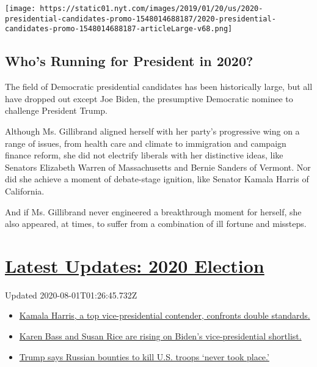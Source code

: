 \href{https://www.nytimes.com/interactive/2019/us/politics/2020-presidential-candidates.html}{}

\texttt{[image: https://static01.nyt.com/images/2019/01/20/us/2020-presidential-candidates-promo-1548014688187/2020-presidential-candidates-promo-1548014688187-articleLarge-v68.png]}

\hypertarget{whos-running-for-president-in-2020}{%
\subsection{Who's Running for President in
2020?}\label{whos-running-for-president-in-2020}}

The field of Democratic presidential candidates has been historically
large, but all have dropped out except Joe Biden, the presumptive
Democratic nominee to challenge President Trump.

Although Ms. Gillibrand aligned herself with her party's progressive
wing on a range of issues, from health care and climate to immigration
and campaign finance reform, she did not electrify liberals with her
distinctive ideas, like Senators Elizabeth Warren of Massachusetts and
Bernie Sanders of Vermont. Nor did she achieve a moment of debate-stage
ignition, like Senator Kamala Harris of California.

And if Ms. Gillibrand never engineered a breakthrough moment for
herself, she also appeared, at times, to suffer from a combination of
ill fortune and missteps.

\hypertarget{latest-updates-2020-election}{%
\section{\texorpdfstring{\href{https://www.nytimes.com/2020/07/31/us/elections/biden-vs-trump.html?action=click\&pgtype=Article\&state=default\&region=MAIN_CONTENT_1\&context=storylines_live_updates}{Latest
Updates: 2020
Election}}{Latest Updates: 2020 Election}}\label{latest-updates-2020-election}}

Updated 2020-08-01T01:26:45.732Z

\begin{itemize}
\tightlist
\item
  \href{https://www.nytimes.com/2020/07/31/us/elections/biden-vs-trump.html?action=click\&pgtype=Article\&state=default\&region=MAIN_CONTENT_1\&context=storylines_live_updates\#link-29fdff45}{Kamala
  Harris, a top vice-presidential contender, confronts double
  standards.}
\item
  \href{https://www.nytimes.com/2020/07/31/us/elections/biden-vs-trump.html?action=click\&pgtype=Article\&state=default\&region=MAIN_CONTENT_1\&context=storylines_live_updates\#link-13ec3d9c}{Karen
  Bass and Susan Rice are rising on Biden's vice-presidential
  shortlist.}
\item
  \href{https://www.nytimes.com/2020/07/31/us/elections/biden-vs-trump.html?action=click\&pgtype=Article\&state=default\&region=MAIN_CONTENT_1\&context=storylines_live_updates\#link-49e9a016}{Trump
  says Russian bounties to kill U.S. troops `never took place.'}
\end{itemize}

